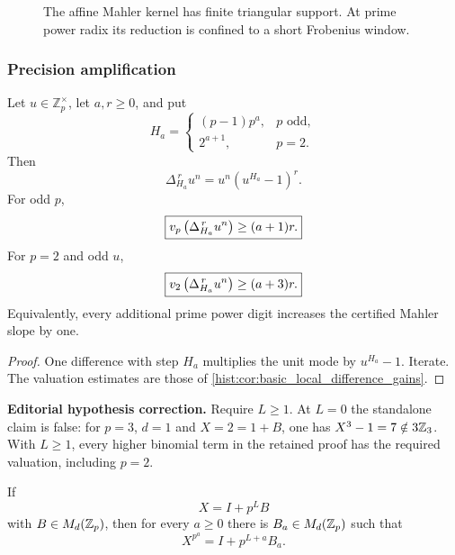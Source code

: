 \begin{figure}[t]
\centering
{}
\caption{The affine Mahler kernel has finite triangular support. At prime power radix its reduction is confined to a short Frobenius window.}
\label{hist:fig:mahler_polyphase_kernel}
\end{figure}

\subsubsection{Precision amplification}

\begin{histtheorem}\label{hist:thm:scalar_polyphase_precision}
Let \(u\in\mathbb Z_p^\times\), let \(a,r\geq0\), and put
\[
H_a=
\begin{cases}
(p-1)p^a,&p\text{ odd},\\
2^{a+1},&p=2.
\end{cases}
\]
Then
\[
\boxed{
\Delta_{H_a}^{\,r}u^n
=
u^n\left(u^{H_a}-1\right)^r.
}
\]
For odd \(p\),
\[
\boxed{
v_p\left(\Delta_{H_a}^{\,r}u^n\right)
\geq(a+1)r.
}
\]
For \(p=2\) and odd \(u\),
\[
\boxed{
v_2\left(\Delta_{H_a}^{\,r}u^n\right)
\geq(a+3)r.
}
\]
Equivalently, every additional prime power digit increases the certified Mahler slope by one.
\end{histtheorem}

\begin{proof}
One difference with step \(H_a\) multiplies the unit mode by \(u^{H_a}-1\). Iterate. The valuation estimates are those of \cref{hist:cor:basic_local_difference_gains}.
\end{proof}

\begin{histlemma}\label{hist:lem:matrix_power_amplification}
\par\noindent\textbf{Editorial hypothesis correction.} Require $L\ge1$. At $L=0$ the standalone claim is false: for $p=3$, $d=1$ and $X=2=1+B$, one has $X^3-1=7\notin3\mathbb Z_3$. With $L\ge1$, every higher binomial term in the retained proof has the required valuation, including $p=2$.\par\medskip
If
\[
X=I+p^LB
\]
with \(B\in M_d(\mathbb Z_p)\), then for every \(a\geq0\) there is \(B_a\in M_d(\mathbb Z_p)\) such that
\[
\boxed{X^{p^a}=I+p^{L+a}B_a.}
\]
\end{histlemma}

